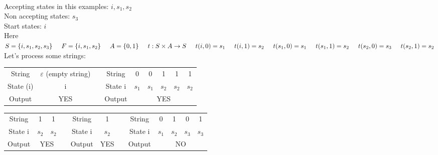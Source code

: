 \documentclass[10pt]{article}
\begin{document}
\begin{description}
\begin{figure}[h!]
		\end{figure}
		~\\
		Accepting states in this examples: $i, s_1, s_2$ \\
		Non accepting states: $s_3$ \\
		Start states: $i$ \\
		Here $S = \{i, s_1, s_2, s_3\} \hspace{5mm} F = \{i, s_1, s_2\} \hspace{5mm} A = \{0, 1\} \hspace{5mm} t: S \times A \rightarrow S \hspace{5mm} t(i, 0) = s_1 \hspace{5mm} t(i, 1) = s_2 \hspace{5mm} t(s_1, 0)  = s_1 \hspace{5mm} t(s_1, 1) = s_2 \hspace{5mm} t(s_2, 0) = s_3 \hspace{5mm} t(s_2, 1) = s_2$ \\
		Let's process some strings:
		\begin{table}[h!]
			\centering
			\begin{tabular}{c|ccc|c|c|c|c|c}
				\cline{1-2} \cline{4-9}
				String & $\varepsilon$ (empty string) & & String & 0 & 0 & 1 & 1 & 1 \\ \cline{1-2} \cline{4-9}
				State (i) & i & & State i & $s_1$ & $s_1$ & $s_2$ & $s_2$ & $s_2$ \\ \cline{1-2} \cline{4-9}
				Output & YES & & Output & \multicolumn{5}{c}{YES} \\ \cline{1-2} \cline{4-9}
			\end{tabular}
		\end{table}
		\begin{table}[h!]
			\centering
			\begin{tabular}{c|c|ccc|ccc|c|c|c|c}
				\cline{1-3} \cline{5-6} \cline{8-12}
				String & 1 & 1 & & String & 1 & & String & 0 & 1 & 0 & 1 \\ \cline{1-3} \cline{5-6} \cline{8-12}
				State i & $s_2$ & $s_2$ & & State i & $s_2$ & & State i & $s_1$ & $s_2$ & $s_3$ & $s_3$ \\ \cline{1-3} \cline{5-6} \cline{8-12}
				Output & \multicolumn{2}{c}{YES} & & Output & YES & & Output & \multicolumn{4}{c}{NO} \\ \cline{1-3} \cline{5-6} \cline{8-12}
			\end{tabular}

\end{table}
\end{description}
\end{document}
